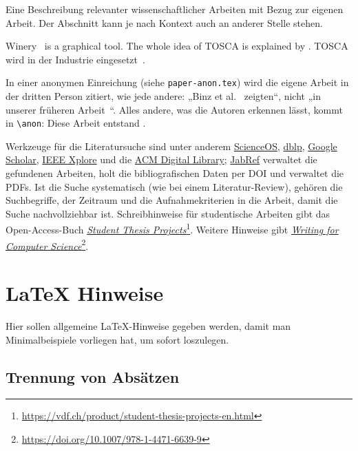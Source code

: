 Eine Beschreibung relevanter wissenschaftlicher Arbeiten mit Bezug zur eigenen Arbeit.
Der Abschnitt kann je nach Kontext auch an anderer Stelle stehen.

Winery~\citep{Winery} is a graphical  tool.
The whole idea of TOSCA is explained by \citet{Binz2009}.
TOSCA wird in der Industrie eingesetzt~.

In einer anonymen Einreichung (siehe \texttt{paper-anon.tex}) wird die eigene Arbeit in der dritten Person zitiert, wie jede andere: „Binz et al.~\cite{Binz2009} zeigten“, nicht „in unserer früheren Arbeit~\cite{Binz2009}“.
Alles andere, was die Autoren erkennen lässt, kommt in \verb+\anon+: Diese Arbeit entstand .

Werkzeuge für die Literatursuche sind unter anderem \href{https://www.scienceos.ai/}{ScienceOS}, \href{https://dblp.org/}{dblp}, \href{https://scholar.google.com/}{Google Scholar}, \href{https://ieeexplore.ieee.org/}{IEEE Xplore} und die \href{https://dl.acm.org/}{ACM Digital Library}; \href{https://www.jabref.org/}{JabRef} verwaltet die gefundenen Arbeiten, holt die bibliografischen Daten per DOI und verwaltet die PDFs.
Ist die Suche systematisch (wie bei einem Literatur-Review), gehören die Suchbegriffe, der Zeitraum und die Aufnahmekriterien in die Arbeit, damit die Suche nachvollziehbar ist.
Schreibhinweise für studentische Arbeiten gibt das Open-Access-Buch \href{https://vdf.ch/product/student-thesis-projects-en.html}{\emph{Student Thesis Projects}}\footnote{\url{https://vdf.ch/product/student-thesis-projects-en.html}}.
Weitere Hinweise gibt \href{https://doi.org/10.1007/978-1-4471-6639-9}{\emph{Writing for Computer Science}}\footnote{\url{https://doi.org/10.1007/978-1-4471-6639-9}}.

\ifluatex
\fi

\section{LaTeX Hinweise}
\label{sec:latexhints}

Hier sollen allgemeine \LaTeX-Hinweise gegeben werden, damit man Minimalbeispiele vorliegen hat, um sofort loszulegen.

\subsection{Trennung von Absätzen}

